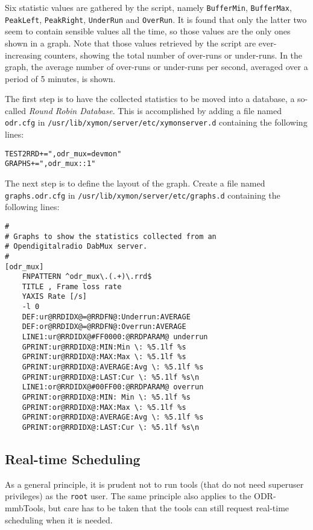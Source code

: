Six statistic values are gathered by the script, namely
\texttt{BufferMin}, \texttt{BufferMax}, \texttt{PeakLeft}, \texttt{PeakRight},
\texttt{UnderRun} and \texttt{OverRun}. It is found that only the latter two
seem to contain sensible values all the time, so those values are the only
ones shown in a graph. Note that those values retrieved by the script are
ever-increasing counters, showing the total number of over-runs or under-runs.
In the graph, the average number of over-runs or under-runs per second, averaged
over a period of 5 minutes, is shown.

The first step is to have the collected statistics to be moved into a database,
a so-called \textit{Round Robin Database}. This is accomplished by adding a file
named \verb+odr.cfg+ in \verb+/usr/lib/xymon/server/etc/xymonserver.d+
containing the following lines:

\begin{verbatim}
TEST2RRD+=",odr_mux=devmon"
GRAPHS+=",odr_mux::1"
\end{verbatim}

The next step is to define the layout of the graph.
Create a file named \verb+graphs.odr.cfg+ in
\verb+/usr/lib/xymon/server/etc/graphs.d+ containing the following lines:

\begin{verbatim}
#
# Graphs to show the statistics collected from an
# Opendigitalradio DabMux server.
#
[odr_mux]
	FNPATTERN ^odr_mux\.(.+)\.rrd$
	TITLE , Frame loss rate
	YAXIS Rate [/s]
	-l 0
	DEF:ur@RRDIDX@=@RRDFN@:Underrun:AVERAGE
	DEF:or@RRDIDX@=@RRDFN@:Overrun:AVERAGE
	LINE1:ur@RRDIDX@#FF0000:@RRDPARAM@ underrun
	GPRINT:ur@RRDIDX@:MIN:Min \: %5.1lf %s
	GPRINT:ur@RRDIDX@:MAX:Max \: %5.1lf %s
	GPRINT:ur@RRDIDX@:AVERAGE:Avg \: %5.1lf %s
	GPRINT:ur@RRDIDX@:LAST:Cur \: %5.1lf %s\n
	LINE1:or@RRDIDX@#00FF00:@RRDPARAM@ overrun
	GPRINT:or@RRDIDX@:MIN: Min \: %5.1lf %s
	GPRINT:or@RRDIDX@:MAX:Max \: %5.1lf %s
	GPRINT:or@RRDIDX@:AVERAGE:Avg \: %5.1lf %s
	GPRINT:or@RRDIDX@:LAST:Cur \: %5.1lf %s\n
\end{verbatim}


\subsection{Real-time Scheduling}
As a general principle, it is prudent not to run tools (that do not need superuser
privileges) as the \texttt{root} user. The same principle also applies to the
ODR-mmbTools, but care has to be taken that the tools can still request real-time
scheduling when it is needed.

